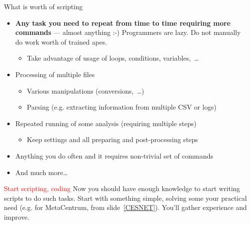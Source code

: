 \documentclass[compress, ucs, xelatex, 11pt, xcolor=svgnames, aspectratio=169,
	hyperref={
		bookmarks=true,
		unicode=true,
		colorlinks=true,
		pdftitle={Linux, command line and MetaCentrum},
		plainpages=false,
		pdfauthor={Vojtech Zeisek},
		pdfsubject={Course about use of Linux command line, writing shell scripts and using MetaCentrum of CESNET},
		pdfcreator={XeLaTeX},
		pdfkeywords={Linux, GNU, BASH, shell, command line, MetaCentrum},
		linkcolor=DarkRed, %
		anchorcolor=DarkBlue, %
		citecolor=Indigo, %
		filecolor=NavyBlue, %
		menucolor=DarkMagenta, %
		urlcolor=DarkBlue, %
		pdftex},
	url={hyphens, lowtilde} %
	]{beamer}
\renewcommand{\alert}[1]{\textcolor{red}{#1}}
\begin{document}
\begin{frame}{What is worth of scripting}
	\begin{itemize}
		\item \textbf{Any task you need to repeat from time to time requiring more commands} --- almost anything :-) Programmers are lazy. Do not manually do work worth of trained apes.
		\begin{itemize}
			\item Take advantage of usage of loops, conditions, variables,~\ldots
		\end{itemize}
		\item Processing of multiple files
		\begin{itemize}
			\item Various manipulations (conversions,~\ldots)
			\item Parsing (e.g. extracting information from multiple CSV or logs)
		\end{itemize}
		\item Repeated running of some analysis (requiring multiple steps)
		\begin{itemize}
			\item Keep settings and all preparing and post-processing steps
		\end{itemize}
		\item Anything you do often and it requires non-trivial set of commands
		\item And much more\ldots
	\end{itemize}
	\begin{block}{\alert{Start scripting, coding}}
		Now you should have enough knowledge to start writing scripts to do such tasks. Start with something simple, solving some your practical need (e.g. for MetaCentrum, from slide~\ref{CESNET}). You'll gather experience and improve.
	\end{block}
\end{frame}
\end{document}
